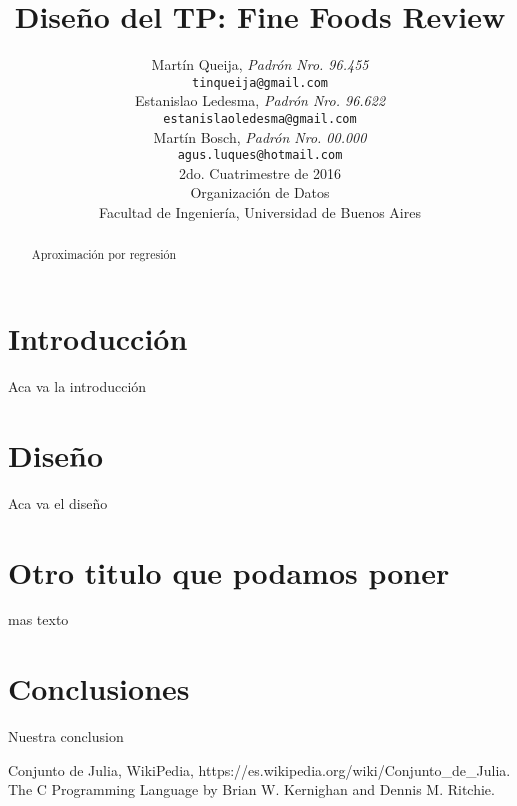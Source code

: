 \documentclass[a4paper,10pt]{article}
\title{		\textbf{Diseño del TP: Fine Foods Review}}
\author{	Martín Queija, \textit{Padrón Nro. 96.455}                     \\
            \texttt{ tinqueija@gmail.com }                                              \\[2.5ex]
            Estanislao Ledesma, \textit{Padrón Nro. 96.622}                     \\
            \texttt{ estanislaoledesma@gmail.com }                                              \\[2.5ex]
            Martín Bosch, \textit{Padrón Nro. 00.000}                     \\
            \texttt{ agus.luques@hotmail.com }                                              \\[2.5ex]
            \normalsize{2do. Cuatrimestre de 2016}                                      \\
            \normalsize{Organización de Datos  }  \\
            \normalsize{Facultad de Ingeniería, Universidad de Buenos Aires}            \\
       }
\date{}
\begin{document}
\maketitle
\thispagestyle{empty}   %


\begin{abstract}
\centerline{Aproximación por regresión}

\end{abstract}
\newpage

\tableofcontents


\section{Introducción}

Aca va la introducción

\section{Diseño}

Aca va el diseño

\section{Otro titulo que podamos poner}

mas texto

\section{Conclusiones}

Nuestra conclusion

\begin{thebibliography}{99}

 Conjunto de Julia, WikiPedia, https://es.wikipedia.org/wiki/Conjunto\_de\_Julia.
 The C Programming Language by Brian W. Kernighan and Dennis M. Ritchie.

\end{thebibliography}
\end{document}
